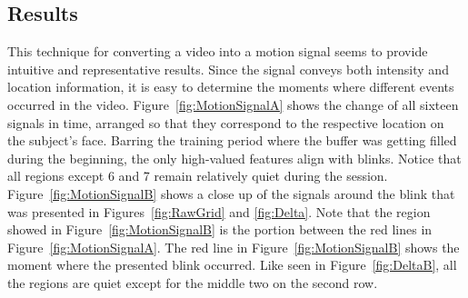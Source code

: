 \documentclass{acm_proc_article-sp}
\begin{document}
\subsection{Results}
This technique for converting a video into a motion signal seems to
provide intuitive and representative results. Since the signal conveys
both intensity and location information, it is easy to determine the
moments where different events occurred in the
video. Figure~\ref{fig:MotionSignalA} shows the change of all sixteen
signals in time, arranged so that they correspond to the respective
location on the subject's face. Barring the training period where the
buffer was getting filled during the beginning, the only high-valued
features align with blinks. Notice that all regions except 6 and 7
remain relatively quiet during the
session. Figure~\ref{fig:MotionSignalB} shows a close up of the
signals around the blink that was presented in
Figures~\ref{fig:RawGrid} and \ref{fig:Delta}. Note that the region
showed in Figure~\ref{fig:MotionSignalB} is the portion between the
red lines in Figure~\ref{fig:MotionSignalA}. The red line in
Figure~\ref{fig:MotionSignalB} shows the moment where the presented
blink occurred. Like seen in Figure~\ref{fig:DeltaB}, all the regions
are quiet except for the middle two on the second row.
\end{document}
